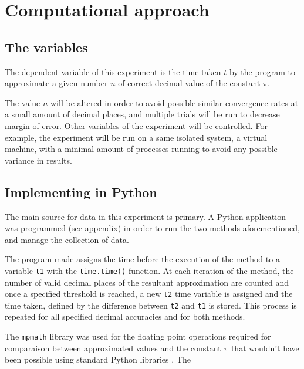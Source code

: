 \section{Computational approach}

\subsection{The variables}
The dependent variable of this experiment is the time taken $t$ by the program 
to approximate a given number $n$ of correct decimal value of the constant $\pi$.

The value $n$ will be altered in order to avoid possible similar convergence rates 
at a small amount of decimal places, and multiple trials will be run to decrease 
margin of error. Other variables of the experiment will be controlled. For example, the experiment 
will be run on a same isolated system, a virtual machine, with a minimal amount of 
processes running to avoid any possible variance in results. 


\subsection{Implementing in Python}

The main source for data in this experiment is primary. A Python application 
was programmed (see appendix) in order to run the two methods aforementioned, and manage 
the collection of data. 

The program made assigns the time before the execution of the method to a variable \verb|t1| 
with the \verb|time.time()| function. At each iteration of the method, the number of valid decimal 
places of the resultant approximation are counted and once a specified threshold is reached, 
a new \verb|t2| time variable is assigned and the time taken, defined by the difference between 
\verb|t2| and \verb|t1| is stored. This process is repeated for all specified decimal accuracies and 
for both methods.

The \verb|mpmath| library was used for the floating point operations required 
for comparaison between approximated values and the constant $\pi$ that wouldn't 
have been possible using standard Python libraries \cite{mpmath}. The 